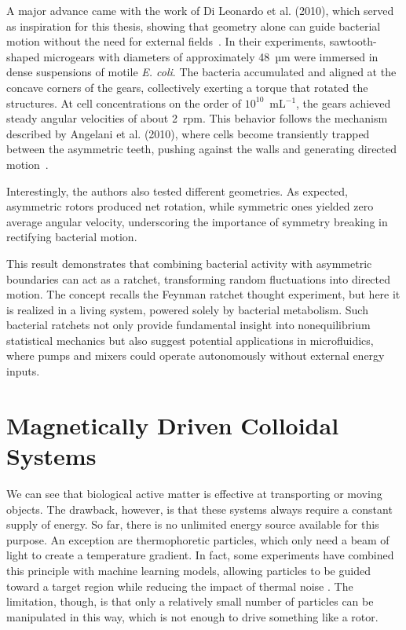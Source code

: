 A major advance came with the work of Di Leonardo et al. (2010), which served as inspiration for this thesis, showing that geometry alone can guide bacterial motion without the need for external fields~\cite{di2010bacterial}. In their experiments, sawtooth-shaped microgears with diameters of approximately 48~µm were immersed in dense suspensions of motile \textit{E. coli}. The bacteria accumulated and aligned at the concave corners of the gears, collectively exerting a torque that rotated the structures. At cell concentrations on the order of $10^{10}$~mL$^{-1}$, the gears achieved steady angular velocities of about 2~rpm. This behavior follows the mechanism described by Angelani et al. (2010), where cells become transiently trapped between the asymmetric teeth, pushing against the walls and generating directed motion~\cite{angelani2010geometrically}. 

Interestingly, the authors also tested different geometries. As expected, asymmetric rotors produced net rotation, while symmetric ones yielded zero average angular velocity, underscoring the importance of symmetry breaking in rectifying bacterial motion. 

This result demonstrates that combining bacterial activity with asymmetric boundaries can act as a ratchet, transforming random fluctuations into directed motion. The concept recalls the Feynman ratchet thought experiment, but here it is realized in a living system, powered solely by bacterial metabolism. Such bacterial ratchets not only provide fundamental insight into nonequilibrium statistical mechanics but also suggest potential applications in microfluidics, where pumps and mixers could operate autonomously without external energy inputs.

\chapter{Magnetically Driven Colloidal Systems}
\label{magneticallydrivencolloidalsystems}


We can see that biological active matter is effective at transporting or moving objects. The drawback, however, is that these systems always require a constant supply of energy. So far, there is no unlimited energy source available for this purpose. An exception are thermophoretic particles, which only need a beam of light to create a temperature gradient. In fact, some experiments have combined this principle with machine learning models, allowing particles to be guided toward a target region while reducing the impact of thermal noise \cite{muinos2021reinforcement}. The limitation, though, is that only a relatively small number of particles can be manipulated in this way, which is not enough to drive something like a rotor.


